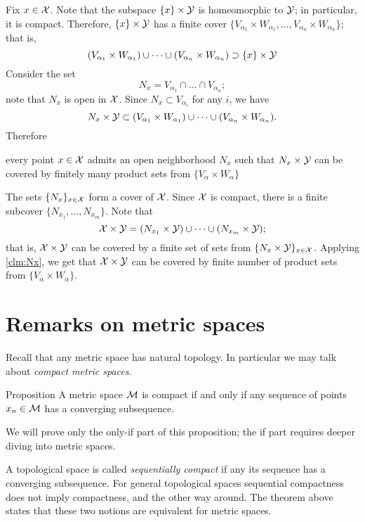 Fix $x \in \mathcal{X}$.
Note that the subspace $\{x\}\times \mathcal{Y}$ is homeomorphic to $\mathcal{Y}$;
in particular, it is compact.
Therefore, $\{x\}\times \mathcal{Y}$ has a finite cover $\{V_{\alpha_1}\times W_{\alpha_1},\dots,V_{\alpha_n}\times W_{\alpha_n}\}$; that is,
\[(V_{\alpha_1}\times W_{\alpha_1})\cup\dots\cup
(V_{\alpha_n}\times W_{\alpha_n})
\supset \{x\}\times \mathcal{Y}\]
Consider the set
\[N_x=V_{\alpha_1}\cap\dots\cap V_{\alpha_n};\]
note that $N_x$ is  open in $\mathcal{X}$.
Since $N_x\subset V_{\alpha_i}$ for any $i$, we have
\[N_x\times \mathcal{Y}\subset (V_{\alpha_1}\times W_{\alpha_1})\cup\dots\cup
(V_{\alpha_n}\times W_{\alpha_n}).\]
Therefore
\begin{clm}{}\label{clm:Nx}
every point $x\in\mathcal{X}$ admits an open neighborhood $N_x$ such that $N_x\times \mathcal{Y}$ can be covered by finitely many product sets from $\{V_\alpha\times W_\alpha\}$
\end{clm}


The sets $\{N_x\}_{x\in\mathcal{X}}$ form a cover of $\mathcal{X}$.
Since $\mathcal{X}$ is compact, 
there is a finite subcover $\{N_{x_1},\dots,N_{x_m}\}$.
Note that 
\[\mathcal{X}\times\mathcal{Y}=(N_{x_1}\times \mathcal{Y})\cup\dots\cup (N_{x_m}\times \mathcal{Y});\]
that is, $\mathcal{X}\times\mathcal{Y}$ can be covered by a finite set of sets from $\{N_x\times \mathcal{Y}\}_{x\in\mathcal{X}}$.
Applying \ref{clm:Nx}, we get that $\mathcal{X}\times\mathcal{Y}$ can be covered by finite number of product sets from $\{V_\alpha\times W_\alpha\}$.
\qeds


\section{Remarks on metric spaces}

Recall that any metric space has natural topology.
In particular we may talk about \emph{compact metric spaces}.

\begin{thm}{Proposition}\label{prop:seq-comp-metr}
A metric space $\mathcal{M}$ is compact if and only if any sequence of points $x_n\in \mathcal{M}$ has a converging subsequence.
\end{thm}

We will prove only the only-if part of this proposition;
the if part requires deeper diving into metric spaces.

A topological space is called \emph{sequentially compact} if any its sequence has a converging subsequence.
For general topological spaces sequential compactness does not imply compactness, and the other way around.
The theorem above states that these two notions are equivalent for metric spaces.

